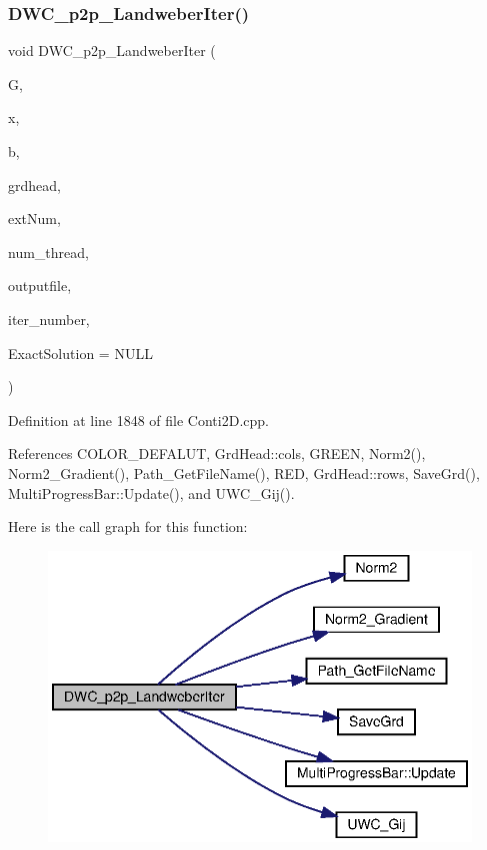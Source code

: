 \subsubsection{D\+W\+C\+\_\+p2p\+\_\+\+Landweber\+Iter()}
{\footnotesize\ttfamily void D\+W\+C\+\_\+p2p\+\_\+\+Landweber\+Iter (\begin{DoxyParamCaption}\item[{double $\ast$}]{G,  }\item[{double $\ast$}]{x,  }\item[{double $\ast$}]{b,  }\item[{\textbf{ Grd\+Head}}]{grdhead,  }\item[{int}]{ext\+Num,  }\item[{int}]{num\+\_\+thread,  }\item[{string}]{outputfile,  }\item[{double}]{iter\+\_\+number,  }\item[{double $\ast$}]{Exact\+Solution = {\ttfamily NULL} }\end{DoxyParamCaption})}



Definition at line 1848 of file Conti2\+D.\+cpp.



References C\+O\+L\+O\+R\+\_\+\+D\+E\+F\+A\+L\+UT, Grd\+Head\+::cols, G\+R\+E\+EN, Norm2(), Norm2\+\_\+\+Gradient(), Path\+\_\+\+Get\+File\+Name(), R\+ED, Grd\+Head\+::rows, Save\+Grd(), Multi\+Progress\+Bar\+::\+Update(), and U\+W\+C\+\_\+\+Gij().

Here is the call graph for this function\+:
\nopagebreak
\begin{figure}[H]
\begin{center}
\leavevmode
\includegraphics[width=342pt]{Conti2D_8h_a8affb7fb2246ce1c959f681fc7baaa05_a8affb7fb2246ce1c959f681fc7baaa05_cgraph}
\end{center}
\end{figure}
\mbox{\label{Conti2D_8h_ac96429563a5015babafa3274c3f3ec73_ac96429563a5015babafa3274c3f3ec73}} 
